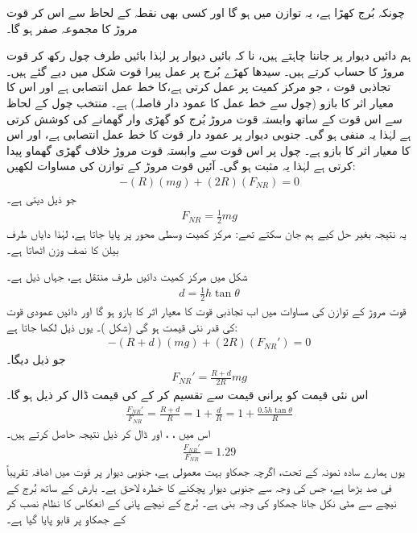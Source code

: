  چونکہ بُرج کھڑا ہے، یہ توازن میں ہو گا اور کسی بھی نقطہ کے لحاظ سے اس کر قوت مروڑ کا مجموعہ صفر ہو گا۔
 
 \quad
 ہم دائیں دیوار پر  جاننا چاہتے ہیں، نا کہ بائیں دیوار پر  لہٰذا  بائیں  طرف چول رکھ کر قوت مروڑ کا حساب کرتے ہیں۔ سیدھا کھڑے بُرج پر عمل پیرا قوت شکل  میں دیے گئے ہیں۔ تجاذبی قوت  ، جو مرکز کمیت پر عمل کرتی ہے،کا خط عمل انتصابی ہے اور اس کا معیار اثر کا بازو  (چول سے خط عمل کا عمود دار فاصلہ)     ہے۔ منتخب چول کے لحاظ سے  اس قوت کے ساتھ وابستہ قوت مروڑ بُرج کو گھڑی وار گھمانے کی کوشش کرتی ہے لہٰذا  یہ منفی ہو گی۔ جنوبی دیوار پر عمود دار قوت  کا خط عمل انتصابی ہے، اور اس کا معیار اثر کا بازو  ہے۔ چول پر  اس قوت سے وابستہ قوت مروڑ خلاف گھڑی گھماو پیدا کرتی ہے لہٰذا یہ مثبت ہو گی۔ آئیں قوت مروڑ  کے توازن کی مساوات  لکھیں:
 \begin{align*}
 -(R)(mg)+(2R)(F_{NR})=0
 \end{align*}
 جو ذیل دیتی ہے۔
 \begin{align*}
 F_{NR}=\frac{1}{2}mg
 \end{align*}
 یہ  نتیجہ بغیر حل کیے ہم جان سکتے تھے: مرکز کمیت وسطی محور پر پایا جاتا ہے، لہٰذا دایاں طرف بیلن کا  نصف وزن اٹھاتا ہے۔
 
 شکل  میں مرکز کمیت دائیں طرف منتقل  ہے، جہاں  ذیل ہے۔
 \begin{align*}
 d=\frac{1}{2}h\tan\theta
 \end{align*}
 قوت مروڑ کے توازن کی مساوات میں اب تجاذبی قوت کا معیار اثر کا بازو  ہو گا اور دائیں عمودی  قوت  کی قدر  نئی قیمت ہو گی (شکل )۔ یوں ذیل لکھا جاتا ہے:
 \begin{align*}
 -(R+d)(mg)+(2R)(F_{NR}')=0
 \end{align*}
 جو ذیل دیگا۔
 \begin{align*}
 F_{NR}'=\frac{R+d}{2R}mg
 \end{align*}
 اس نئی قیمت کو  پرانی قیمت سے تقسیم کر کے  کی قیمت ڈال کر ذیل ہو گا۔
 \begin{align*}
 \frac{F_{NR}'}{F_{NR}}=\frac{R+d}{R}=1+\frac{d}{R}=1+\frac{0.5h\tan\theta}{R}
 \end{align*}
 اس میں  ، ، اور  ڈال کر ذیل نتیجہ حاصل کرتے ہیں۔
 \begin{align*}
 \frac{F_{NR}'}{F_{NR}}=1.29
 \end{align*}
 یوں ہمارے سادہ نمونہ کے تحت، اگرچہ جھکاو بہت معمولی ہے، جنوبی دیوار پر قوت میں اضافہ تقریباً  فی صد بڑھا ہے، جس کی وجہ سے    جنوبی دیوار   پچکنے کا خطرہ لاحق ہے۔  بارش کے ساتھ بُرج کے نیچے سے   مٹی   نکل  جانا جھکاو کی وجہ بنی ہے۔ بُرج کے نیچے پانی کے انعکاس کا نظام نصب کر کے جھکاو پر قابو پایا گیا ہے۔

